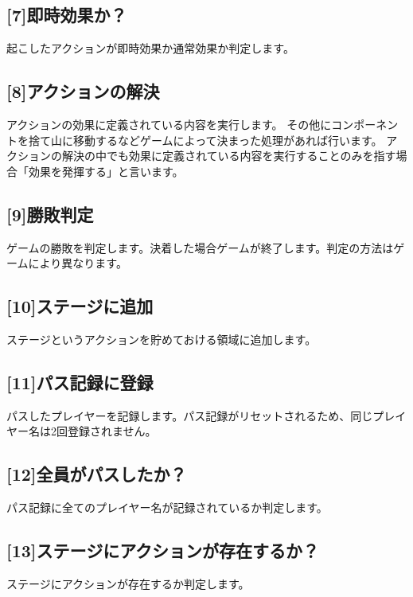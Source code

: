 \documentclass[letterpaper,10pt,dvipdfmx]{sphinxmanual}
\begin{document}
\subsection{{[}7{]}即時効果か？}
\label{\detokenize{core/core:id20}}
\sphinxAtStartPar
起こしたアクションが即時効果か通常効果か判定します。


\subsection{{[}8{]}アクションの解決}
\label{\detokenize{core/core:actresolve}}\label{\detokenize{core/core:id21}}
\sphinxAtStartPar
アクションの効果に定義されている内容を実行します。
その他にコンポーネントを捨て山に移動するなどゲームによって決まった処理があれば行います。
アクションの解決の中でも効果に定義されている内容を実行することのみを指す場合「効果を発揮する」と言います。


\subsection{{[}9{]}勝敗判定}
\label{\detokenize{core/core:winlose}}\label{\detokenize{core/core:id22}}
\sphinxAtStartPar
ゲームの勝敗を判定します。決着した場合ゲームが終了します。判定の方法はゲームにより異なります。


\subsection{{[}10{]}ステージに追加}
\label{\detokenize{core/core:id23}}
\sphinxAtStartPar
ステージというアクションを貯めておける領域に追加します。


\subsection{{[}11{]}パス記録に登録}
\label{\detokenize{core/core:id24}}
\sphinxAtStartPar
パスしたプレイヤーを記録します。パス記録がリセットされるため、同じプレイヤー名は2回登録されません。


\subsection{{[}12{]}全員がパスしたか？}
\label{\detokenize{core/core:id25}}
\sphinxAtStartPar
パス記録に全てのプレイヤー名が記録されているか判定します。


\subsection{{[}13{]}ステージにアクションが存在するか？}
\label{\detokenize{core/core:id26}}
\sphinxAtStartPar
ステージにアクションが存在するか判定します。
\end{document}
